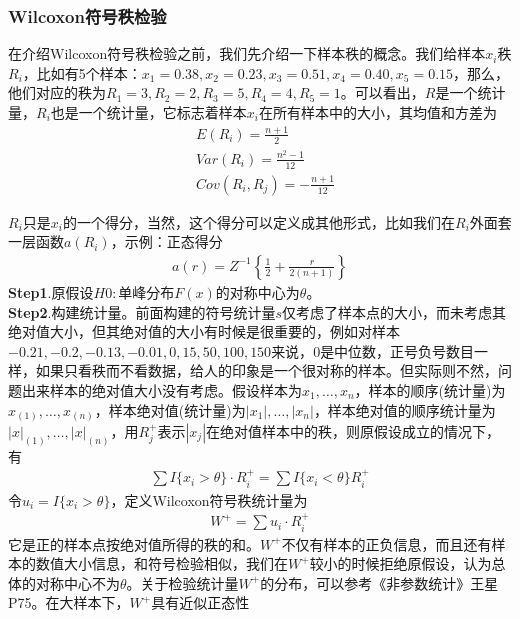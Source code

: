         \subsubsection{Wilcoxon符号秩检验}
            \par
            在介绍Wilcoxon符号秩检验之前，我们先介绍一下样本秩的概念。我们给样本$x_i$秩$R_i$，比如有5个样本：$x_1 = 0.38,x_2 = 0.23,x_3 = 0.51,x_4 = 0.40,x_5 = 0.15$，那么，他们对应的秩为$R_1 = 3,R_2 = 2,R_3 = 5,R_4 = 4,R_5=1$。可以看出，$R$是一个统计量，$R_i$也是一个统计量，它标志着样本$x_i$在所有样本中的大小，其均值和方差为
            \begin{align*}
            &E(R_i) = \frac{n+1}{2} \\
            &Var(R_i) = \frac{n^2-1}{12}\\
            &Cov(R_i,R_j) = -\frac{n+1}{12}
            \end{align*}
            \par
            $R_i$只是$x_i$的一个得分，当然，这个得分可以定义成其他形式，比如我们在$R_i$外面套一层函数$a(R_i)$，示例：正态得分
            \begin{align*}
            a(r) = Z^{-1}\left\{ \frac{1}{2} + \frac{r}{2(n+1)} \right\}
            \end{align*}
            \textbf{Step1}.原假设$H0:$单峰分布$F(x)$的对称中心为$\theta$。\\
            \textbf{Step2}.构建统计量。前面构建的符号统计量$s$仅考虑了样本点的大小，而未考虑其绝对值大小，但其绝对值的大小有时候是很重要的，例如对样本$-0.21,-0.2,-0.13,-0.01,0,15,50,100,150$来说，$0$是中位数，正号负号数目一样，如果只看秩而不看数据，给人的印象是一个很对称的样本。但实际则不然，问题出来样本的绝对值大小没有考虑。假设样本为$x_1,\dots,x_n$，样本的顺序(统计量)为$x_{(1)},\dots,x_{(n)}$，样本绝对值(统计量)为$|x_1|,\dots,|x_n|$，样本绝对值的顺序统计量为$|x|_{(1)},\dots,|x|_{(n)}$，用$R_j^+$表示$|x_j|$在绝对值样本中的秩，则原假设成立的情况下，有
            \begin{align*}
            \sum I\{x_{i} > \theta \}\cdot R_i^+ = \sum I\{x_{i}<\theta\}R_i^+
            \end{align*}
            令$u_i = I\{x_{i} > \theta \}$，定义Wilcoxon符号秩统计量为
            \begin{align*}
            W^+ = \sum u_i\cdot R_i^+
            \end{align*}
            它是正的样本点按绝对值所得的秩的和。$W^+$不仅有样本的正负信息，而且还有样本的数值大小信息，和符号检验相似，我们在$W^+$较小的时候拒绝原假设，认为总体的对称中心不为$\theta$。关于检验统计量$W^+$的分布，可以参考《非参数统计》王星P75。在大样本下，$W^+$具有近似正态性
